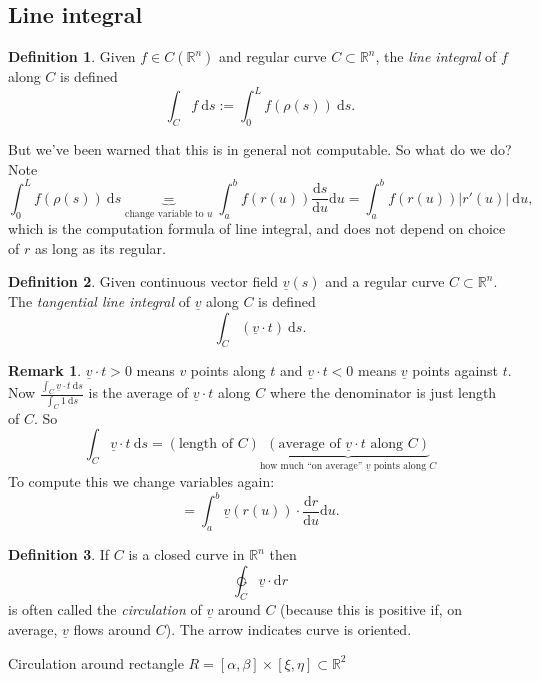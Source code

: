 \documentclass[a4paper]{article}
\theoremstyle{definition}
\newtheorem{defn}{Definition}[subsection]
\newtheorem*{remark}{Remark}
\begin{document}
\subsection{Line integral}
\begin{defn}
Given $f\in C(\mathbb R^n)$ and regular curve $C\subset \mathbb R^n$, the \textit{line integral} of $f$ along $C$ is defined
\[
\int_C f \ \mathrm d s := \int_0^L f(\rho(s)) \ \mathrm d s.
\]
\end{defn}
But we've been warned that this is in general not computable. So what do we do? Note
\[
\int_0^L f(\rho(s)) \ \mathrm d s \underbrace{=}_{\text{change variable to }u} \int_a^b f(r(u)) \frac{\mathrm d s}{\mathrm d u} \mathrm d u = \int_a^b f(r(u)) |r'(u)| \ \mathrm d u,
\]
which is the computation formula of line integral, and does not depend on choice of $r$ as long as its regular.

\begin{defn}
Given continuous vector field $\underline v(s)$ and a regular curve $C\subset \mathbb R^n$. The \textit{tangential line integral} of $\underline v$ along $C$ is defined
\[
\int_C (\underline v\cdot t)\ \mathrm d s.
\]
\end{defn}
\begin{remark}
$\underline v\cdot t>0$ means $v$ points along $t$ and $\underline v\cdot t<0$ means $\underline v$ points against $t$. Now $\displaystyle \frac{\int_C \underline v \cdot t \ \mathrm d s}{\int_C 1 \ \mathrm d s}$ is the average of $\underline v\cdot t$ along $C$ where the denominator is just length of $C$. So
\[
\int_C \underline v \cdot t \ \mathrm d s= (\text{length of } C) \underbrace{(\text{average of }\underline v\cdot t \text{ along }C)}_{\text{how much ``on average'' }\underline v\text{ points along }C}
\]
To compute this we change variables again:
\[
=\int_a^b \underline v(r(u)) \cdot \frac{\mathrm d r}{\mathrm d u} \mathrm d u.
\]
\end{remark}
\begin{defn}
If $C$ is a closed curve in $\mathbb R^n$ then
\[
\ointctrclockwise_C \underline v \cdot \mathrm d r
\]
is often called the \textit{circulation} of $\underline v$ around $C$ (because this is positive if, on average, $\underline v$ flows around $C$). The arrow indicates curve is oriented.
\end{defn}

Circulation around rectangle $R=[\alpha,\beta]\times [\xi,\eta] \subset \mathbb R^2$

\begin{center}
\end{center}
\end{document}
